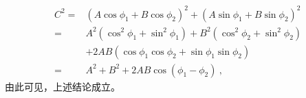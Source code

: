 \begin{equation}
\begin{aligned}
C^2
= & \left(A \cos \phi_1+B \cos \phi_2\right)^2+\left(A \sin \phi_1+B \sin \phi_2\right)^2 \\
= & A^2\left(\cos ^2 \phi_1+\sin ^2 \phi_1\right)+B^2\left(\cos ^2 \phi_2+\sin ^2 \phi_2\right) \\
& +2 A B\left(\cos \phi_1 \cos \phi_2+\sin \phi_1 \sin \phi_2\right) \\
= & A^2+B^2+2 A B \cos \left(\phi_1-\phi_2\right)~,
\end{aligned}
\end{equation}
由此可见，上述结论成立。